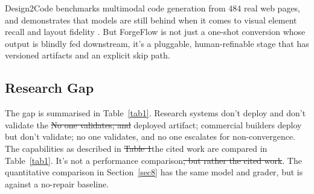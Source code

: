 \documentclass[pdflatex,sn-mathphys-num]{sn-jnl}%
\newcommand{\fix}[1]{{\color{fixcol}#1}}
\newcommand{\fixdel}[1]{{\color{fixcol}\sout{#1}}}
\newcommand{\rw}[2]{{\color{rwcol}#1}}%
\theoremstyle{thmstyleone}%
\theoremstyle{thmstyletwo}%
\theoremstyle{thmstylethree}%
\begin{document}
Design2Code benchmarks multimodal code generation from 484 real web pages, and demonstrates that models are still behind when it comes to visual element recall and layout fidelity \cite{r23si}. But ForgeFlow is not just a one-shot conversion whose output is blindly fed downstream, it's a pluggable, human-refinable stage that has versioned artifacts and an explicit skip path.

\subsection{Research Gap}\label{sec2.6}

\rw{The gap is summarised in Table~\ref{tab1}. Research systems don't deploy and don't validate the \fixdel{No one validates, and} deployed artifact; commercial builders deploy but don't validate; \fix{no one validates, and} no one escalates for non-convergence. The capabilities as described in \fixdel{Table 1}\fix{the cited work} are compared\fix{ in Table~\ref{tab1}}. It's not a performance comparison\fixdel{, but rather the cited work}. The quantitative comparison in Section~\ref{sec8} has the same model and grader, but is against a no-repair baseline.}{Table~\ref{tab1} summarises the gap. Research systems don't deploy and don't validate the deployed artifact; commercial builders deploy but don't validate; no one validates, and no one escalates for non-convergence. Table~\ref{tab1} compares capabilities as described in the cited work; it is not a performance comparison. The quantitative comparison in Section~\ref{sec8} is against a no-repair baseline with the same model and grader.}
\end{document}
